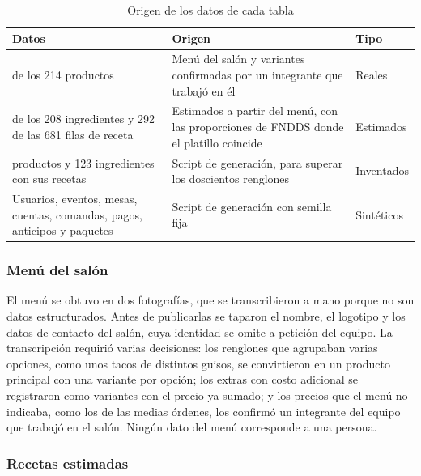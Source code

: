 \begin{table}[H]
    \centering
    \small
    \begin{tabularx}{\textwidth}
        {
            >{\RaggedRight\arraybackslash}X
            >{\RaggedRight\arraybackslash}X
            >{\RaggedRight\arraybackslash}p{2cm}
        }
        \toprule
        \textbf{Datos} & \textbf{Origen} & \textbf{Tipo} \\
        \midrule
        122 de los 214 productos & Menú del salón y variantes confirmadas por un integrante que trabajó en él & Reales \\
        85 de los 208 ingredientes y 292 de las 681 filas de receta & Estimados a partir del menú, con las proporciones de FNDDS donde el platillo coincide & Estimados \\
        92 productos y 123 ingredientes con sus recetas & Script de generación, para superar los doscientos renglones & Inventados \\
        Usuarios, eventos, mesas, cuentas, comandas, pagos, anticipos y paquetes & Script de generación con semilla fija & Sintéticos \\
        \bottomrule
    \end{tabularx}
    \captionsetup{labelfont=bf, textfont=it, labelsep=newline, justification=raggedright, singlelinecheck=false}
    \caption{Origen de los datos de cada tabla}
    \label{tab:fuentes}
\end{table}

\subsubsection{Menú del salón}

El menú se obtuvo en dos fotografías, que se transcribieron a mano porque no son datos estructurados. Antes de publicarlas se taparon el nombre, el logotipo y los datos de contacto del salón, cuya identidad se omite a petición del equipo. La transcripción requirió varias decisiones: los renglones que agrupaban varias opciones, como unos tacos de distintos guisos, se convirtieron en un producto principal con una variante por opción; los extras con costo adicional se registraron como variantes con el precio ya sumado; y los precios que el menú no indicaba, como los de las medias órdenes, los confirmó un integrante del equipo que trabajó en el salón. Ningún dato del menú corresponde a una persona.

\subsubsection{Recetas estimadas}

